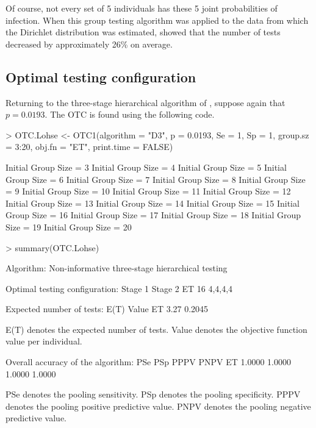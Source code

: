 Of course, not every set of 5 individuals has these 5 joint probabilities
of infection. When this group testing algorithm was applied to the
data from which the Dirichlet distribution was estimated, \citet{bilder2019informative}
showed that the number of tests decreased by approximately 26\% on
average. 

\subsection[Optimal testing configuration]{Optimal testing configuration\label{subsec:Optimal-testing-configuration}}

Returning to the three-stage hierarchical algorithm of \citet{lohse2020pooling},
suppose again that $p=0.0193$. The OTC is found using the following
code. 

\noindent 

\begin{Schunk}
\begin{Sinput}
> OTC.Lohse <- OTC1(algorithm = "D3", p = 0.0193, Se = 1, Sp = 1,
     group.sz = 3:20, obj.fn = "ET", print.time = FALSE)
\end{Sinput}
\begin{Soutput}
Initial Group Size = 3
Initial Group Size = 4
Initial Group Size = 5
Initial Group Size = 6
Initial Group Size = 7
Initial Group Size = 8
Initial Group Size = 9
Initial Group Size = 10
Initial Group Size = 11
Initial Group Size = 12
Initial Group Size = 13
Initial Group Size = 14
Initial Group Size = 15
Initial Group Size = 16
Initial Group Size = 17
Initial Group Size = 18
Initial Group Size = 19
Initial Group Size = 20
\end{Soutput}
\begin{Sinput}
> summary(OTC.Lohse)
\end{Sinput}
\begin{Soutput}

Algorithm: Non-informative three-stage hierarchical testing 

Optimal testing configuration:
   Stage 1 Stage 2
ET      16 4,4,4,4

Expected number of tests:
   E(T)  Value
ET 3.27 0.2045

E(T) denotes the expected number of tests.
Value denotes the objective function value per individual.

Overall accuracy of the algorithm:
      PSe    PSp   PPPV   PNPV
ET 1.0000 1.0000 1.0000 1.0000

PSe denotes the pooling sensitivity.
PSp denotes the pooling specificity.
PPPV denotes the pooling positive predictive value.
PNPV denotes the pooling negative predictive value.
\end{Soutput}
\end{Schunk}

